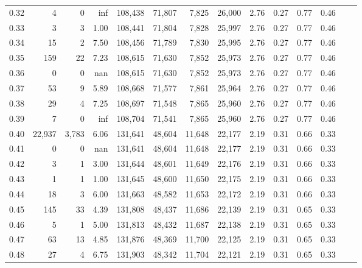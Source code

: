 \begin{tabular}{rrrrrrrrrrrrrr}
0.32 &       4 &      0 &     inf &  108,438 &   71,807 &   7,825 &  26,000 &  2.76 &  0.27 &  0.77 &      0.46 \\
0.33 &       3 &      3 &    1.00 &  108,441 &   71,804 &   7,828 &  25,997 &  2.76 &  0.27 &  0.77 &      0.46 \\
0.34 &      15 &      2 &    7.50 &  108,456 &   71,789 &   7,830 &  25,995 &  2.76 &  0.27 &  0.77 &      0.46 \\
0.35 &     159 &     22 &    7.23 &  108,615 &   71,630 &   7,852 &  25,973 &  2.76 &  0.27 &  0.77 &      0.46 \\
0.36 &       0 &      0 &     nan &  108,615 &   71,630 &   7,852 &  25,973 &  2.76 &  0.27 &  0.77 &      0.46 \\
0.37 &      53 &      9 &    5.89 &  108,668 &   71,577 &   7,861 &  25,964 &  2.76 &  0.27 &  0.77 &      0.46 \\
0.38 &      29 &      4 &    7.25 &  108,697 &   71,548 &   7,865 &  25,960 &  2.76 &  0.27 &  0.77 &      0.46 \\
0.39 &       7 &      0 &     inf &  108,704 &   71,541 &   7,865 &  25,960 &  2.76 &  0.27 &  0.77 &      0.46 \\
0.40 &  22,937 &  3,783 &    6.06 &  131,641 &   48,604 &  11,648 &  22,177 &  2.19 &  0.31 &  0.66 &      0.33 \\
0.41 &       0 &      0 &     nan &  131,641 &   48,604 &  11,648 &  22,177 &  2.19 &  0.31 &  0.66 &      0.33 \\
0.42 &       3 &      1 &    3.00 &  131,644 &   48,601 &  11,649 &  22,176 &  2.19 &  0.31 &  0.66 &      0.33 \\
0.43 &       1 &      1 &    1.00 &  131,645 &   48,600 &  11,650 &  22,175 &  2.19 &  0.31 &  0.66 &      0.33 \\
0.44 &      18 &      3 &    6.00 &  131,663 &   48,582 &  11,653 &  22,172 &  2.19 &  0.31 &  0.66 &      0.33 \\
0.45 &     145 &     33 &    4.39 &  131,808 &   48,437 &  11,686 &  22,139 &  2.19 &  0.31 &  0.65 &      0.33 \\
0.46 &       5 &      1 &    5.00 &  131,813 &   48,432 &  11,687 &  22,138 &  2.19 &  0.31 &  0.65 &      0.33 \\
0.47 &      63 &     13 &    4.85 &  131,876 &   48,369 &  11,700 &  22,125 &  2.19 &  0.31 &  0.65 &      0.33 \\
0.48 &      27 &      4 &    6.75 &  131,903 &   48,342 &  11,704 &  22,121 &  2.19 &  0.31 &  0.65 &      0.33 \\

\end{tabular}
